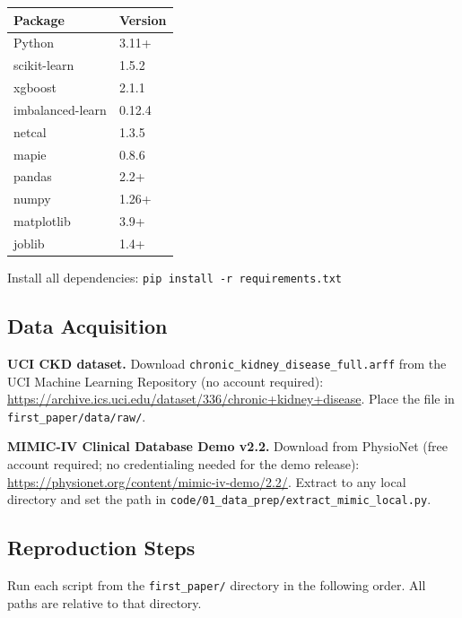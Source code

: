 \documentclass[11pt]{article}
\begin{document}
\begin{center}
\begin{tabular}{ll}
\toprule
Package & Version \\
\midrule
Python           & 3.11+ \\
scikit-learn     & 1.5.2 \\
xgboost          & 2.1.1 \\
imbalanced-learn & 0.12.4 \\
netcal           & 1.3.5 \\
mapie            & 0.8.6 \\
pandas           & 2.2+ \\
numpy            & 1.26+ \\
matplotlib       & 3.9+ \\
joblib           & 1.4+ \\
\bottomrule
\end{tabular}
\end{center}

Install all dependencies: \quad\texttt{pip install -r requirements.txt}

\subsection*{Data Acquisition}

\textbf{UCI CKD dataset.} Download \texttt{chronic\_kidney\_disease\_full.arff}
from the UCI Machine Learning Repository (no account required):
\url{https://archive.ics.uci.edu/dataset/336/chronic+kidney+disease}.
Place the file in \texttt{first\_paper/data/raw/}.

\textbf{MIMIC-IV Clinical Database Demo v2.2.} Download from PhysioNet
(free account required; no credentialing needed for the demo release):
\url{https://physionet.org/content/mimic-iv-demo/2.2/}.
Extract to any local directory and set the path in
\texttt{code/01\_data\_prep/extract\_mimic\_local.py}.

\subsection*{Reproduction Steps}

Run each script from the \texttt{first\_paper/} directory in the
following order. All paths are relative to that directory.
\end{document}
